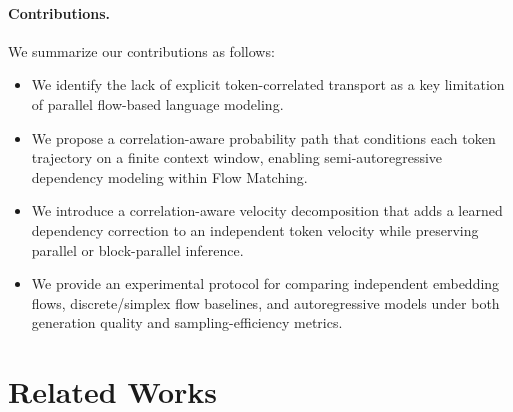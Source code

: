 \documentclass{article} %
\begin{document}
\paragraph{Contributions.}
We summarize our contributions as follows:
\begin{itemize}
    \item We identify the lack of explicit token-correlated transport as a key limitation of parallel flow-based language modeling.
    \item We propose a correlation-aware probability path that conditions each token trajectory on a finite context window, enabling semi-autoregressive dependency modeling within Flow Matching.
    \item We introduce a correlation-aware velocity decomposition that adds a learned dependency correction to an independent token velocity while preserving parallel or block-parallel inference.
    \item We provide an experimental protocol for comparing independent embedding flows, discrete/simplex flow baselines, and autoregressive models under both generation quality and sampling-efficiency metrics.
\end{itemize}


\section{Related Works}
\end{document}
